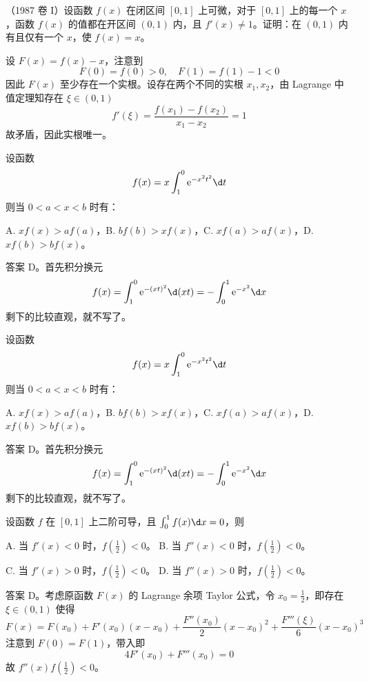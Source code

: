\begin{problem}[000021]
（1987 卷 I）设函数 $f(x)$ 在闭区间 $[0,1]$ 上可微，对于 $[0, 1]$ 上的每一个 $x$，函数 $f(x)$ 的值都在开区间 $(0, 1)$ 内，且 $f'(x) \neq 1$。证明：在 $(0, 1)$ 内有且仅有一个 $x$，使 $f(x) = x$。
\end{problem}

\begin{solution}
	设 $F(x) = f(x) - x$，注意到
	\[ F(0) = f(0) > 0, \quad F(1) = f(1) - 1 < 0 \]
	因此 $F(x)$ 至少存在一个实根。设存在两个不同的实根 $x_1, x_2$，由 Lagrange 中值定理知存在 $\xi \in (0, 1)$
	\[ f'(\xi) = \frac{f(x_1) - f(x_2)}{x_1 - x_2} = 1 \]
	故矛盾，因此实根唯一。
\end{solution}

\begin{problem}[000022]
设函数
\[ f(x) = x \int_{1}^{0} \ee^{-x^2t^2} \d t \]
则当 $0<a<x<b$ 时有：

A. $xf(x) > af(a)$，B. $bf(b) > x f(x)$，C. $xf(a) > af(x)$，D. $xf(b) > bf(x)$。
\end{problem}

\begin{solution}
	答案 D。首先积分换元
	\[ f(x) = \int_{1}^{0} \ee^{-(xt)^2} \d (xt) = -\int_{0}^{1} \ee^{-x^2} \d x  \]
	剩下的比较直观，就不写了。
\end{solution}

\begin{problem}[000022]
设函数
\[ f(x) = x \int_{1}^{0} \ee^{-x^2t^2} \d t \]
则当 $0<a<x<b$ 时有：

A. $xf(x) > af(a)$，B. $bf(b) > x f(x)$，C. $xf(a) > af(x)$，D. $xf(b) > bf(x)$。
\end{problem}

\begin{solution}
	答案 D。首先积分换元
	\[ f(x) = \int_{1}^{0} \ee^{-(xt)^2} \d (xt) = -\int_{0}^{1} \ee^{-x^2} \d x  \]
	剩下的比较直观，就不写了。
\end{solution}

\begin{problem}[000023]
设函数 $f$ 在 $[0, 1]$ 上二阶可导，且 $\int_{0}^{1} f(x) \d x = 0$，则

A. 当 $f'(x) < 0$ 时，$f(\frac{1}{2}) < 0$。
B. 当 $f''(x) < 0$ 时，$f(\frac{1}{2}) < 0$。

C. 当 $f'(x) > 0$ 时，$f(\frac{1}{2}) < 0$。
D. 当 $f''(x) > 0$ 时，$f(\frac{1}{2}) < 0$。
\end{problem}

\begin{solution}
	答案 D。考虑原函数 $F(x)$ 的 Lagrange 余项 Taylor 公式，令 $x_0 = \frac{1}{2}$，即存在 $\xi \in (0, 1)$ 使得
	\[ F(x) = F(x_0) + F'(x_0)(x-x_0) + \frac{F''(x_0)}{2}(x-x_0)^2 + \frac{F'''(\xi)}{6}(x-x_0)^3 \]
	注意到 $F(0) = F(1)$，带入即
	\[ 4 F'(x_0) + F'''(x_0) = 0 \]
	故 $f''(x) f(\frac{1}{2}) < 0$。
\end{solution}


